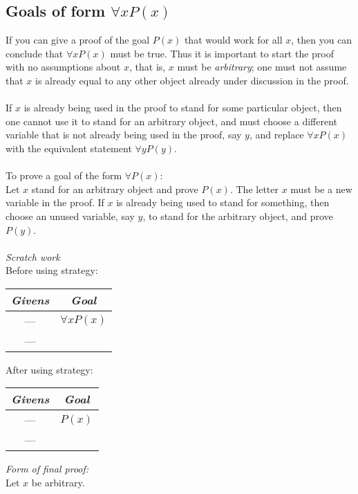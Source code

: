 \documentclass{report}
\begin{document}
\subsection{Goals of form $\forall xP(x)$}
If you can give a proof of the goal $P(x)$ that would work for all $x$, then you can conclude that $\forall xP(x)$ must
be true. Thus it is important to start the proof with
no assumptions about $x$, that is, $x$ must be \textit{arbitrary}; one must not assume that $x$ is already equal
to any other object already under discussion in the proof.\\
\vspace{1mm}\\
If $x$ is already being used in the proof to stand for
some particular object, then one cannot use it to stand for an
arbitrary object, and must choose a different variable that is not already being used in the proof, say $y$, and replace 
$\forall xP(x)$ with the equivalent statement $\forall yP(y)$.\\
\vspace{1mm}\\
\indent To prove a goal of the form  $\forall P(x)$:\\
\indent Let $x$ stand for an arbitrary object and prove $P(x)$. The letter $x$ must be a new variable in the proof. 
If $x$ is already being used to stand for something, then choose an unused variable, say $y$, to stand for the arbitrary 
object, and prove $P(y)$.\\
\vspace{1mm}\\
\textit{Scratch work}\\
Before using strategy:
\begin{center}
\begin{tabular}{c|c}
\textit{Givens}&\textit{Goal}\\
\hline
---&$\forall xP(x)$\\
---&
\end{tabular}
\end{center}
After using strategy:
\begin{center}
\begin{tabular}{c|c}
\textit{Givens}&\textit{Goal}\\
\hline
---&$P(x)$\\
---&
\end{tabular}
\end{center}
\textit{Form of final proof:}\\
\indent Let $x$ be arbitrary.\\
\end{document}

